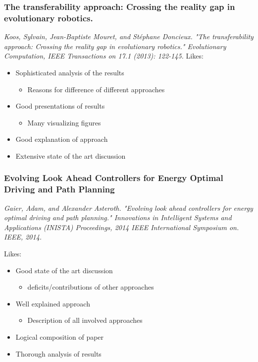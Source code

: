 \documentclass[8pt]{beamer}
\begin{document}
\begin{frame}
	\frametitle{The transferability approach: Crossing the reality gap in evolutionary robotics.}
	\textit{Koos, Sylvain, Jean-Baptiste Mouret, and Stéphane Doncieux. "The transferability approach: Crossing the reality gap in evolutionary robotics." Evolutionary Computation, IEEE Transactions on 17.1 (2013): 122-145.}\vspace{5mm}
	Likes:
	\begin{itemize}
		\item Sophisticated analysis of the results
		\begin{itemize}
			\item Reasons for difference of different approaches
		\end{itemize}
		\item Good presentations of results
		\begin{itemize}
			\item Many visualizing figures 
		\end{itemize}
		\item Good explanation of approach
		\item Extensive state of the art discussion
	\end{itemize}
	
\end{frame}

\begin{frame}
	\frametitle{Evolving Look Ahead Controllers for Energy
Optimal Driving and Path Planning}
\textit{Gaier, Adam, and Alexander Asteroth. "Evolving look ahead controllers for energy optimal driving and path planning." Innovations in Intelligent Systems and Applications (INISTA) Proceedings, 2014 IEEE International Symposium on. IEEE, 2014.}\vspace{5mm}

	Likes:
	\begin{itemize}
		\item Good state of the art discussion
		\begin{itemize}
			\item deficits/contributions of other approaches
		\end{itemize}
		\item Well explained approach
		\begin{itemize}
			\item Description of all involved approaches
		\end{itemize}
		\item Logical composition of paper
		\item Thorough analysis of results
	\end{itemize}


	
\end{frame}
\end{document}
